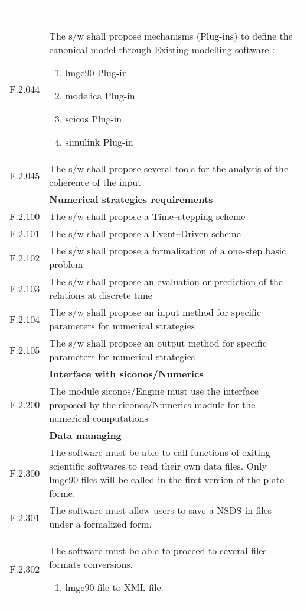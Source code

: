 \begin{longtable}{%
    |>{\columncolor[gray]{.8}}p{}%
    |>{\columncolor[gray]{.95}}p{}|}
\begin{enumerate}
  \end{enumerate}\\
  F.2.044  &   The s/w shall propose mechanisms (Plug-ins) to define the canonical model through Existing modelling software :
  \begin{enumerate}
  \item \ac{lmgc90} Plug-in
  \item \ac{modelica} Plug-in
  \item \ac{scicos} Plug-in
  \item \ac{simulink} Plug-in
  \end{enumerate} \\
  F.2.045  &   The s/w shall propose several tools for the analysis of the coherence of the  input\\
 \hline
  & \textbf{Numerical strategies requirements }\\
  \hline
  F.2.100  & The s/w shall propose a Time--stepping scheme\\
  F.2.101  & The s/w shall propose a Event--Driven scheme\\
  F.2.102  & The s/w shall propose a formalization of a one-step basic problem\\
  F.2.103  & The s/w shall propose an evaluation or prediction of the relations at discrete time\\
  F.2.104  & The s/w shall propose an input method for specific parameters for numerical strategies\\
  F.2.105  & The s/w shall propose an output method for specific parameters for numerical strategies\\
  \hline
  & \textbf{Interface with \ac{siconos}/Numerics }\\
  \hline
  F.2.200  & The module \ac{siconos}/Engine must use the interface proposed by the  \ac{siconos}/Numerics module for the numerical computations \\
  \hline
  & \textbf{Data managing}\\
  \hline
  F.2.300  &  The software must be able to call functions of exiting scientific softwares to read their own data files. Only \ac{lmgc90} files will be called in the first version of the plate-forme. \\
  F.2.301  & The software must allow users to save a NSDS in files under a formalized form. \\
  F.2.302  & The software must be able to proceed to several files formats conversions.
                \begin{enumerate}
                \item \ac{lmgc90} file to XML file.

\end{enumerate}
\end{longtable}
